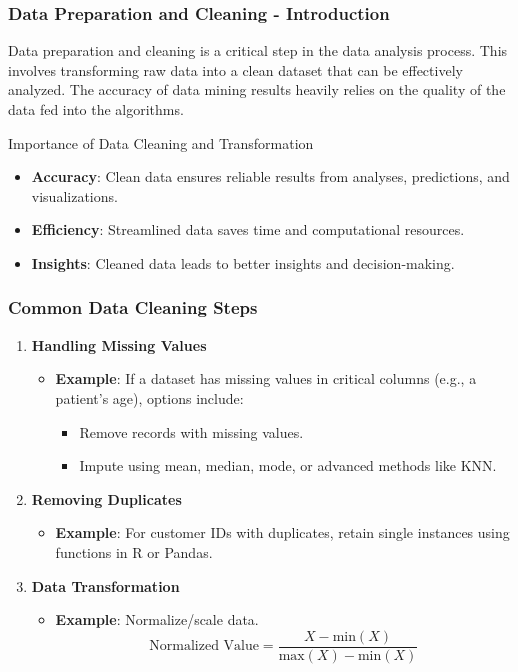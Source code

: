 \documentclass{beamer}
\begin{document}
\begin{frame}[fragile]
    \frametitle{Data Preparation and Cleaning - Introduction}
    Data preparation and cleaning is a critical step in the data analysis process. This involves transforming raw data into a clean dataset that can be effectively analyzed. The accuracy of data mining results heavily relies on the quality of the data fed into the algorithms. 

    \begin{block}{Importance of Data Cleaning and Transformation}
        \begin{itemize}
            \item \textbf{Accuracy}: Clean data ensures reliable results from analyses, predictions, and visualizations.
            \item \textbf{Efficiency}: Streamlined data saves time and computational resources.
            \item \textbf{Insights}: Cleaned data leads to better insights and decision-making.
        \end{itemize}
    \end{block}
\end{frame}

\begin{frame}[fragile]
    \frametitle{Common Data Cleaning Steps}
    \begin{enumerate}
        \item \textbf{Handling Missing Values}
            \begin{itemize}
                \item \textbf{Example}: If a dataset has missing values in critical columns (e.g., a patient's age), options include:
                \begin{itemize}
                    \item Remove records with missing values.
                    \item Impute using mean, median, mode, or advanced methods like KNN.
                \end{itemize}
            \end{itemize}
        
        \item \textbf{Removing Duplicates}
            \begin{itemize}
                \item \textbf{Example}: For customer IDs with duplicates, retain single instances using functions in R or Pandas.
            \end{itemize}

        \item \textbf{Data Transformation}
            \begin{itemize}
                \item \textbf{Example}: Normalize/scale data.
                \begin{equation}
                    \text{Normalized Value} = \frac{X - \text{min}(X)}{\text{max}(X) - \text{min}(X)}
                \end{equation}
            \end{itemize}
    \end{enumerate}
\end{frame}
\end{document}
